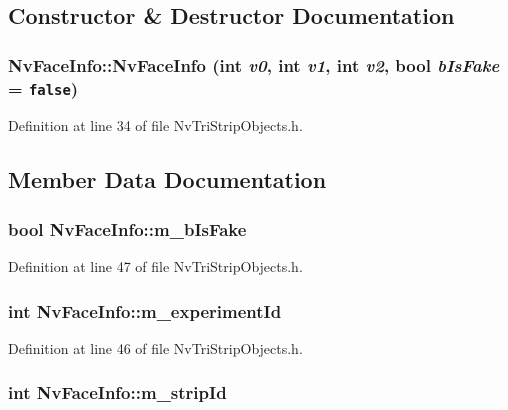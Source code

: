 \subsection{Constructor \& Destructor Documentation}
\hypertarget{class_nv_face_info_70f29df90b39a59cc72a78ac17d1534d}{
\subsubsection[{NvFaceInfo}]{\setlength{\rightskip}{0pt plus 5cm}NvFaceInfo::NvFaceInfo (int {\em v0}, \/  int {\em v1}, \/  int {\em v2}, \/  bool {\em bIsFake} = {\tt false})}}
\label{class_nv_face_info_70f29df90b39a59cc72a78ac17d1534d}




Definition at line 34 of file NvTriStripObjects.h.

\subsection{Member Data Documentation}
\hypertarget{class_nv_face_info_3eb9c236439d47f135f94e445e5d4a6c}{
\subsubsection[{m\_\-bIsFake}]{\setlength{\rightskip}{0pt plus 5cm}bool {\bf NvFaceInfo::m\_\-bIsFake}}}
\label{class_nv_face_info_3eb9c236439d47f135f94e445e5d4a6c}




Definition at line 47 of file NvTriStripObjects.h.\hypertarget{class_nv_face_info_b2cd22f81463cd7fb8b43a4a14040317}{
\subsubsection[{m\_\-experimentId}]{\setlength{\rightskip}{0pt plus 5cm}int {\bf NvFaceInfo::m\_\-experimentId}}}
\label{class_nv_face_info_b2cd22f81463cd7fb8b43a4a14040317}




Definition at line 46 of file NvTriStripObjects.h.\hypertarget{class_nv_face_info_d0229ac7acde8d0048910429ed8d0887}{
\subsubsection[{m\_\-stripId}]{\setlength{\rightskip}{0pt plus 5cm}int {\bf NvFaceInfo::m\_\-stripId}}}
\label{class_nv_face_info_d0229ac7acde8d0048910429ed8d0887}




